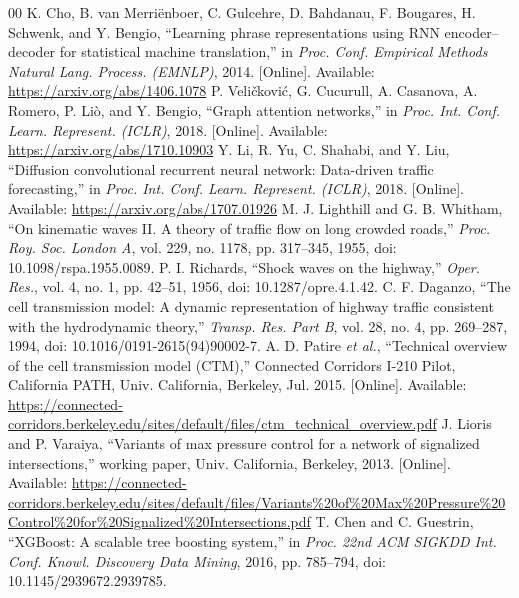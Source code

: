 \documentclass[conference]{IEEEtran}
\begin{document}
\begin{thebibliography}{00}
 K. Cho, B. van Merri\"enboer, C. Gulcehre, D. Bahdanau, F. Bougares, H. Schwenk, and Y. Bengio, ``Learning phrase representations using RNN encoder--decoder for statistical machine translation,'' in \emph{Proc. Conf. Empirical Methods Natural Lang. Process. (EMNLP)}, 2014. [Online]. Available: \url{https://arxiv.org/abs/1406.1078}
 P. Veli\v{c}kovi\'c, G. Cucurull, A. Casanova, A. Romero, P. Li\`o, and Y. Bengio, ``Graph attention networks,'' in \emph{Proc. Int. Conf. Learn. Represent. (ICLR)}, 2018. [Online]. Available: \url{https://arxiv.org/abs/1710.10903}
 Y. Li, R. Yu, C. Shahabi, and Y. Liu, ``Diffusion convolutional recurrent neural network: Data-driven traffic forecasting,'' in \emph{Proc. Int. Conf. Learn. Represent. (ICLR)}, 2018. [Online]. Available: \url{https://arxiv.org/abs/1707.01926}
 M. J. Lighthill and G. B. Whitham, ``On kinematic waves II. A theory of traffic flow on long crowded roads,'' \emph{Proc. Roy. Soc. London A}, vol. 229, no. 1178, pp. 317--345, 1955, doi: 10.1098/rspa.1955.0089.
 P. I. Richards, ``Shock waves on the highway,'' \emph{Oper. Res.}, vol. 4, no. 1, pp. 42--51, 1956, doi: 10.1287/opre.4.1.42.
 C. F. Daganzo, ``The cell transmission model: A dynamic representation of highway traffic consistent with the hydrodynamic theory,'' \emph{Transp. Res. Part B}, vol. 28, no. 4, pp. 269--287, 1994, doi: 10.1016/0191-2615(94)90002-7.
 A. D. Patire \emph{et al.}, ``Technical overview of the cell transmission model (CTM),'' Connected Corridors I-210 Pilot, California PATH, Univ. California, Berkeley, Jul. 2015. [Online]. Available: \url{https://connected-corridors.berkeley.edu/sites/default/files/ctm_technical_overview.pdf}
 J. Lioris and P. Varaiya, ``Variants of max pressure control for a network of signalized intersections,'' working paper, Univ. California, Berkeley, 2013. [Online]. Available: \url{https://connected-corridors.berkeley.edu/sites/default/files/Variants%20of%20Max%20Pressure%20Control%20for%20Signalized%20Intersections.pdf}
 T. Chen and C. Guestrin, ``XGBoost: A scalable tree boosting system,'' in \emph{Proc. 22nd ACM SIGKDD Int. Conf. Knowl. Discovery Data Mining}, 2016, pp. 785--794, doi: 10.1145/2939672.2939785.
\end{thebibliography}
\end{document}
